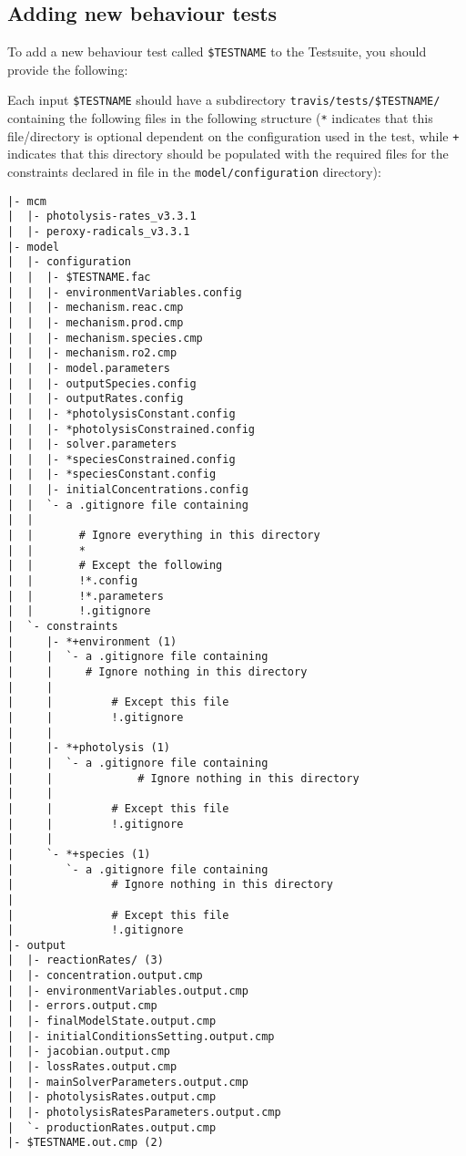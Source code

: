 \subsection{Adding new behaviour
  tests} \label{subsec:adding-new-behaviour-tests}

To add a new behaviour test called \texttt{\$TESTNAME} to the
Testsuite, you should provide the following:

Each input \texttt{\$TESTNAME} should have a subdirectory
\texttt{travis/tests/\$TESTNAME/} containing the following files in
the following structure (\texttt{*} indicates that this file/directory
is optional dependent on the configuration used in the test, while
\texttt{+} indicates that this directory should be populated with the
required files for the constraints declared in file in the
\texttt{model/configuration} directory):

\begin{verbatim}
|- mcm
|  |- photolysis-rates_v3.3.1
|  |- peroxy-radicals_v3.3.1
|- model
|  |- configuration
|  |  |- $TESTNAME.fac
|  |  |- environmentVariables.config
|  |  |- mechanism.reac.cmp
|  |  |- mechanism.prod.cmp
|  |  |- mechanism.species.cmp
|  |  |- mechanism.ro2.cmp
|  |  |- model.parameters
|  |  |- outputSpecies.config
|  |  |- outputRates.config
|  |  |- *photolysisConstant.config
|  |  |- *photolysisConstrained.config
|  |  |- solver.parameters
|  |  |- *speciesConstrained.config
|  |  |- *speciesConstant.config
|  |  |- initialConcentrations.config
|  |  `- a .gitignore file containing
|  |
|  |       # Ignore everything in this directory
|  |       *
|  |       # Except the following
|  |       !*.config
|  |       !*.parameters
|  |       !.gitignore
|  `- constraints
|     |- *+environment (1)
|     |  `- a .gitignore file containing
|     |     # Ignore nothing in this directory
|     |
|     |         # Except this file
|     |         !.gitignore
|     |
|     |- *+photolysis (1)
|     |  `- a .gitignore file containing
|     |             # Ignore nothing in this directory
|     |
|     |         # Except this file
|     |         !.gitignore
|     |
|     `- *+species (1)
|        `- a .gitignore file containing
|               # Ignore nothing in this directory
|
|               # Except this file
|               !.gitignore
|- output
|  |- reactionRates/ (3)
|  |- concentration.output.cmp
|  |- environmentVariables.output.cmp
|  |- errors.output.cmp
|  |- finalModelState.output.cmp
|  |- initialConditionsSetting.output.cmp
|  |- jacobian.output.cmp
|  |- lossRates.output.cmp
|  |- mainSolverParameters.output.cmp
|  |- photolysisRates.output.cmp
|  |- photolysisRatesParameters.output.cmp
|  `- productionRates.output.cmp
|- $TESTNAME.out.cmp (2)
\end{verbatim}

